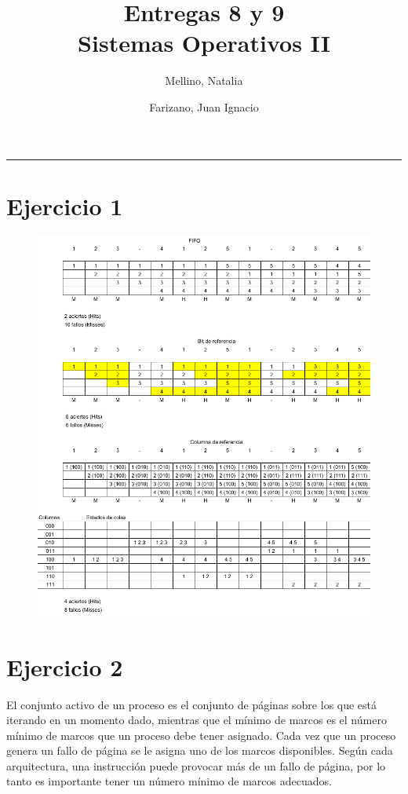 \documentclass[11pt]{article}
\title{
    Entregas 8 y 9 \\
    \large Sistemas Operativos II}
\author{Mellino, Natalia \and Farizano, Juan Ignacio}
\date{}
\begin{document}
\maketitle

\noindent\rule{\textwidth}{1pt}

\section*{Ejercicio 1}

\begin{figure}[h!]
    \begin{center}
      \includegraphics[width=0.85\linewidth]{Paginación.pdf}
    \end{center}
  \end{figure}

\section*{Ejercicio 2}

El conjunto activo de un proceso es el conjunto de páginas sobre los que está
iterando en un momento dado, mientras que el mínimo de marcos es el número
mínimo de marcos que un proceso debe tener asignado. Cada vez que un proceso
genera un fallo de página se le asigna uno de los marcos disponibles. Según cada 
arquitectura, una instrucción puede provocar más de un fallo de página, por lo
tanto es importante tener un número mínimo de marcos adecuados.
\end{document}
